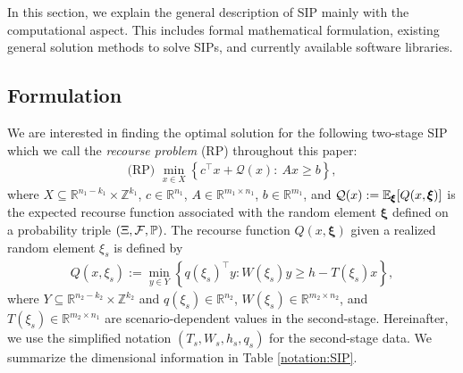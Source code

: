 In this section, we explain the general description of SIP mainly with the computational aspect. This includes formal mathematical formulation, existing general solution methods to solve SIPs, and currently available software libraries.
\subsection{Formulation}
We are interested in finding the optimal solution for the following two-stage SIP which we call the \textit{recourse problem} (RP) throughout this paper:
\begin{align}
\textrm{(RP) }\min_{x\in X}{\left\{c^\top x + \mathcal{Q}(x):\ Ax\ge b\right\}}, \label{eq:SIP_1}
\end{align}
where $X\subseteq \mathbb{R}^{n_1-k_1}\times\mathbb{Z}^{k_1}$, $c\in\mathbb{R}^{n_1}$, $A\in\mathbb{R}^{m_1\times n_1}$, $b\in\mathbb{R}^{m_1}$, and $\mathcal{Q}(x):=\operatorname*{\mathbb{E}}_{\pmb{\xi}}[Q(x,\pmb{\xi})]$ is the expected recourse function associated with the random element $\pmb{\xi}$ defined on a probability triple $(\Xi, \mathcal{F},\operatorname*{\mathbb{P}})$. The recourse function $Q(x,\pmb{\xi})$ given a realized random element $\xi_s$ is defined by 
\begin{align}
Q(x,\xi_s):=\min_{y\in Y}\left\{q(\xi_s)^\top y : W(\xi_s)y\ge h-T(\xi_s)x\right\},
\end{align}
where $Y\subseteq\mathbb{R}^{n_2-k_2}\times\mathbb{Z}^{k_2}$ and $q(\xi_s)\in\mathbb{R}^{n_2}$, $W(\xi_s)\in\mathbb{R}^{m_2\times n_2}$, and $T(\xi_s)\in\mathbb{R}^{m_2\times n_1}$ are scenario-dependent values in the second-stage. Hereinafter, we use the simplified notation $(T_s,W_s,h_s,q_s)$ for the second-stage data. We summarize the dimensional information in Table \ref{notation:SIP}.



